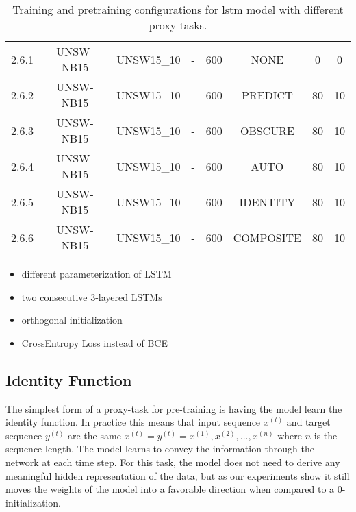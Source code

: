 \begin{table}[h]
{\begin{tabular}{cccccccc}
		2.6.1 \label{ex_2_6_1} & UNSW-NB15    & UNSW15\_10 & -           & 600           & NONE       & 0         & 0           \\
		2.6.2 \label{ex_2_6_2} & UNSW-NB15    & UNSW15\_10 & -           & 600           & PREDICT    & 80        & 10          \\
		2.6.3 \label{ex_2_6_3} & UNSW-NB15    & UNSW15\_10 & -           & 600           & OBSCURE      & 80        & 10          \\
		2.6.4 \label{ex_2_6_4} & UNSW-NB15    & UNSW15\_10 & -           & 600           & AUTO       & 80        & 10          \\
		2.6.5 \label{ex_2_6_5} & UNSW-NB15    & UNSW15\_10 & -           & 600           & IDENTITY   & 80        & 10          \\
		2.6.6 \label{ex_2_6_6} & UNSW-NB15    & UNSW15\_10 & -           & 600           & COMPOSITE  & 80        & 10         
	\end{tabular}}
	\caption{Training and pretraining configurations for \gls{lstm} model with different proxy tasks.}
	\label{table:experiments:lstm:configurations}
\end{table}

\begin{itemize}
	\item different parameterization of LSTM
	\item two consecutive 3-layered LSTMs
	\item orthogonal initialization
	\item CrossEntropy Loss instead of BCE
\end{itemize}

\subsection{Identity Function} \label{sec:experiments:lstm:identity}

The simplest form of a proxy-task for pre-training is having the model learn the identity function.
In practice this means that input sequence $x^{(t)}$ and target sequence $y^{(t)}$ are the same $x^{(t)} = y^{(t)} = x^{(1)}, x^{(2)}, ... , x^{(n)}$ where $n$ is the sequence length. The model learns to convey the information through the network at each time step. For this task, the model does not need to derive any meaningful hidden representation of the data, but as our experiments show it still moves the weights of the model into a favorable direction when compared to a 0-initialization. 

